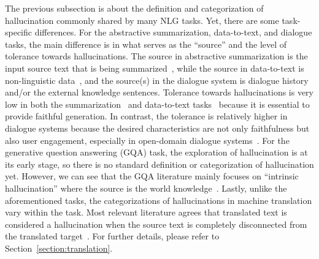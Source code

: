 The previous subsection is about the definition and categorization of hallucination commonly shared by many NLG tasks. Yet, there are some task-specific differences. 
For the abstractive summarization, data-to-text, and dialogue tasks, the main difference is in what serves as the ``source'' and the level of tolerance towards hallucinations. 
 The source in abstractive summarization is the input source text that is being summarized~, while the source in data-to-text is non-linguistic data~, and the source(s) in the dialogue system is dialogue history and/or the external knowledge sentences.
Tolerance towards hallucinations is very low in both the summarization~ and data-to-text tasks~ because it is essential to provide faithful generation. In contrast, the tolerance is relatively higher in dialogue systems because the desired characteristics are not only faithfulness but also user engagement, especially in open-domain dialogue systems~. 
For the generative question answering (GQA) task, the exploration of hallucination is at its early stage, so there is no standard definition or categorization of hallucination yet. However, we can see that the GQA literature mainly focuses on ``intrinsic hallucination'' where the source is the world knowledge~. Lastly, unlike the aforementioned tasks, the categorizations of hallucinations in machine translation vary within the task. Most relevant literature agrees that translated text is considered a hallucination when the source text is completely disconnected from the translated target~.
For further details, please refer to Section~\ref{section:translation}.

